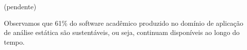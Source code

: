 \label{conclusoes}

(pendente)


Observamos que 61\% do software acadêmico produzido no domínio de aplicação de análise estática
são sustentáveis, ou seja, continuam disponíveis ao longo do tempo.







